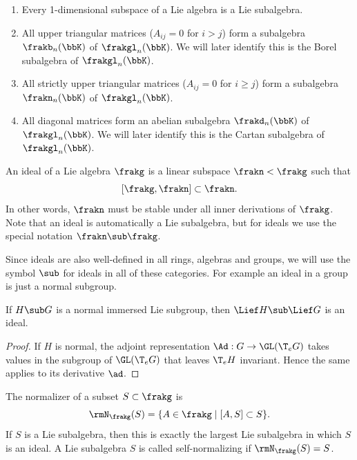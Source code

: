 \begin{example}
    \begin{enumerate}
        \item Every 1-dimensional subspace of a Lie algebra is a Lie subalgebra.
        \item All upper triangular matrices ($A_{ij}=0$ for $i>j$) form a subalgebra $\frakb_n(\bbK)$ of $\frakgl_n(\bbK)$. We will later identify this is the Borel subalgebra of $\frakgl_n(\bbK)$.
        \item All strictly upper triangular matrices ($A_{ij}=0$ for $i\geq j$) form a subalgebra $\frakn_n(\bbK)$ of $\frakgl_n(\bbK)$.
        \item All diagonal matrices form an abelian subalgebra $\frakd_n(\bbK)$ of $\frakgl_n(\bbK)$. We will later identify this is the Cartan subalgebra of $\frakgl_n(\bbK)$.
    \end{enumerate}
\end{example}



\begin{defn}[Ideal]
    An ideal of a Lie algebra $\frakg$ is a linear subspace $\frakn<\frakg$ such that
    \[[\frakg,\frakn]\subset \frakn.\]
    In other words, $\frakn$ must be stable under all inner derivations of $\frakg$. Note that an ideal is automatically a Lie subalgebra, but for ideals we use the special notation $\frakn\sub \frakg$.\index{$\sub$}
\end{defn}

Since ideals are also well-defined in all rings, algebras and groups, we will use the symbol $\sub$ for ideals in all of these categories. For example an ideal in a group is just a normal subgroup.

\begin{prop}\label{prop 11.1.2 HN}
    If $H\sub G$ is a normal immersed Lie subgroup, then $\Lief H\sub \Lief G$ is an ideal.
\end{prop}
\begin{proof}
    If $H$ is normal, the adjoint representation $\Ad:G\to \GL(\T_eG)$ takes values in the subgroup of $\GL(\T_eG)$ that leaves $\T_e H$ invariant. Hence the same applies to its derivative $\ad$.
\end{proof}

\begin{defn}
    The normalizer of a subset $S\subset \frakg$ is
    \[\rmN_\frakg(S)=\{A\in\frakg\mid [A,S]\subset S\}.\]
    If $S$ is a Lie subalgebra, then this is exactly the largest Lie subalgebra in which $S$ is an ideal. A Lie subalgebra $S$ is called self-normalizing if $\rmN_\frakg(S)=S$.
\end{defn}

